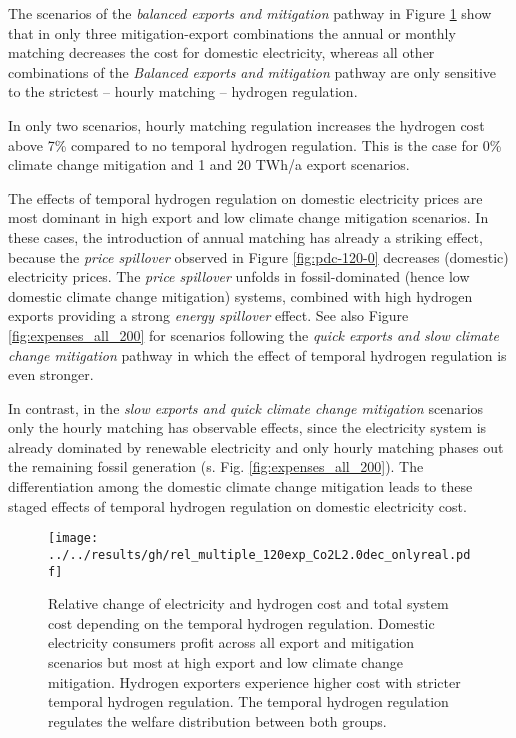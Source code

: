 The scenarios of the \textit{balanced exports and mitigation} pathway in Figure \ref{fig:expenses_real_120} show that in only three mitigation-export combinations the annual or monthly matching decreases the cost for domestic electricity, whereas all other combinations of the \textit{Balanced exports and mitigation} pathway are only sensitive to the strictest -- hourly matching -- hydrogen regulation. 

In only two scenarios, hourly matching regulation increases the hydrogen cost above 7\% compared to no temporal hydrogen regulation. This is the case for 0\% climate change mitigation and 1 and 20 TWh/a export scenarios.

The effects of temporal hydrogen regulation on domestic electricity prices are most dominant in high export and low climate change mitigation scenarios. 
In these cases, the introduction of annual matching has already a striking effect, because the \textit{price spillover} observed in Figure \ref{fig:pdc-120-0} decreases (domestic) electricity prices. The \textit{price spillover} unfolds in fossil-dominated (hence low domestic climate change mitigation) systems, combined with high hydrogen exports providing a strong \textit{energy spillover} effect.
See also Figure \ref{fig:expenses_all_200} for  scenarios following the \textit{quick exports and slow climate change mitigation} pathway in which the effect of temporal hydrogen regulation is even stronger.

In contrast, in the \textit{slow exports and quick climate change mitigation} scenarios only the hourly matching has observable effects, since the electricity system is already  dominated by renewable electricity and only hourly matching phases out the remaining fossil generation (s. Fig. \ref{fig:expenses_all_200}). The differentiation among the domestic climate change mitigation leads to these staged effects of temporal hydrogen regulation on domestic electricity cost.


\begin{figure}[h!]
    \centering
    \texttt{[image: ../../results/gh/rel\_multiple\_120exp\_Co2L2.0dec\_onlyreal.pdf]}
    \caption{Relative change of electricity and hydrogen cost and total system cost depending on the temporal hydrogen regulation. Domestic electricity consumers profit across all export and mitigation scenarios but most at high export and low climate change mitigation. Hydrogen exporters experience higher cost with stricter temporal hydrogen regulation. The temporal hydrogen regulation regulates the welfare distribution between both groups.}
    \label{fig:expenses_real_120}
\end{figure}




